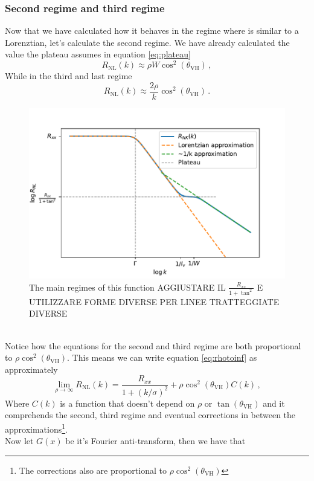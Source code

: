 \subsubsection*{Second regime and third regime}
Now that we have calculated how it behaves in the regime where is similar to a Lorenztian, let's calculate the second regime. We have already calculated the value the plateau assumes in equation \ref{eq:plateau} 
\begin{equation}
    R_{\textrm{NL}}(k)\approx \rho W\cos^2(\theta_{\textrm{VH}})\,,
    \label{eq:second_regime}
\end{equation}
While in the third and last regime 
\begin{equation}
    R_{\textrm{NL}}(k)\approx \frac{2\rho}k \cos^2(\theta_{\textrm{VH}})\,.
    \label{eq:third_regime}
\end{equation}
\begin{figure}[h!]
    \centering
    \includegraphics[width=\linewidth]{Immagini/rnl/rho3.pdf}
    \caption{The main regimes of this function AGGIUSTARE IL $\frac{R_{xx}}{1+\tan^2}$ E UTILIZZARE FORME DIVERSE PER LINEE TRATTEGGIATE DIVERSE}
    \label{fig:rho3}
\end{figure}\\
Notice how the equations for the second and third regime are both proportional to $\rho\cos^2(\theta_{\textrm{VH}})$. This means we can write equation \ref{eq:rhotoinf} as approximately
\begin{equation}
    \lim_{\rho\to\infty} R_{\textrm{NL}}(k)=\frac{R_{xx}}{1+(k/\sigma)^2} + \rho\cos^2(\theta_{\textrm{VH}}) C(k)\,,
    \label{eq:rhotoinf2}
\end{equation}
Where $C(k)$ is a function that doesn't depend on $\rho$ or $\tan(\theta_{\textrm{VH}})$ and it comprehends the second, third regime and eventual corrections in between the approximations\footnote{The corrections also are proportional to $\rho\cos^2(\theta_{\textrm{VH}})$}.\\%
Now let $G(x)$ be it's Fourier anti-transform, then we have that 

